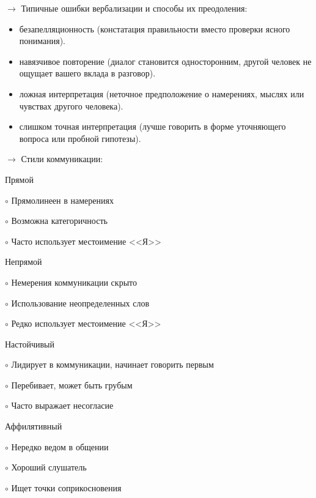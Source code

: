\documentclass[12pt,a4paper]{report}
\begin{document}
\bigskip 
$\rightarrow$ Типичные ошибки вербализации и способы их преодоления:
\begin{itemize}
	\item безапелляционность (констатация правильности вместо проверки ясного понимания).
	\item навязчивое повторение (диалог становится односторонним, другой человек не ощущает вашего вклада в разговор).
	\item ложная интерпретация (неточное предположение о намерениях, мыслях или чувствах другого человека).
	\item слишком точная интерпретация (лучше говорить в форме уточняющего вопроса или пробной гипотезы).
\end{itemize}

\bigskip
$\rightarrow$ {\large Стили коммуникации}:
	 
\bigskip
\begin{minipage}{0.45\textwidth}
		{\large Прямой}
	
	\smallskip
	$\circ$ Прямолинеен в намерениях
	
	$\circ$ Возможна категоричность
	
	$\circ$ Часто использует местоимение <<Я>>
\end{minipage}
\hfill
\begin{minipage}{0.45\textwidth}
		{\large Непрямой}
		
	\smallskip
	$\circ$ Немерения коммуникации скрыто
	
	$\circ$ Использование неопределенных слов
	
	$\circ$ Редко использует местоимение <<Я>>
\end{minipage}

\bigskip
\begin{minipage}{0.45\textwidth}
	{\large Настойчивый}
	
	\smallskip
	$\circ$ Лидирует в коммуникации, начинает говорить первым
	
	$\circ$ Перебивает, может быть грубым
	
	$\circ$ Часто выражает несогласие
\end{minipage}
\hfill
\begin{minipage}{0.45\textwidth}
	{\large Аффилятивный}
	
	\smallskip
	$\circ$ Нередко ведом в общении
	
	$\circ$ Хороший слушатель
	
	$\circ$ Ищет точки соприкосновения
\end{minipage}
\end{document}
